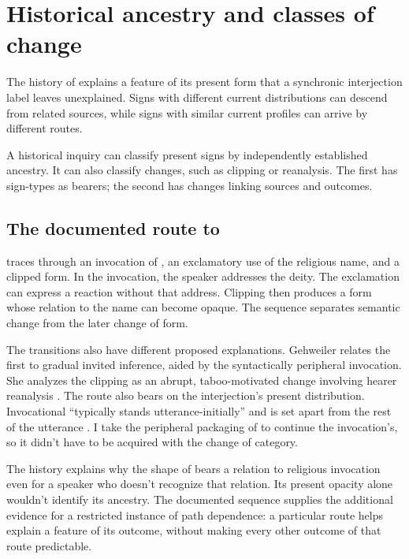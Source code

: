 \documentclass[12pt]{article}
\begin{document}
\section{Historical ancestry and classes of change}\label{sec:history}

The history of  explains a feature of its present form
that a synchronic interjection label leaves unexplained. Signs with
different current distributions can descend from related sources, while
signs with similar current profiles can arrive by different routes.

A historical inquiry can classify present signs by independently established
ancestry. It can also classify changes, such as clipping or reanalysis.
The first has sign-types as bearers; the second has changes linking
sources and outcomes.

\subsection{The documented route to }

\textcite{gehweiler2008} traces  through an invocation of ,
an exclamatory use of the religious name, and a clipped form. In the invocation, the speaker addresses the deity.
The exclamation can express a reaction without that address. Clipping
then produces a form whose relation to the name can become opaque.
The sequence separates semantic change from the later change of form.

The transitions also have different proposed explanations. Gehweiler
relates the first to gradual invited inference, aided by the syntactically
peripheral invocation. She analyzes the clipping as an abrupt, taboo-motivated
change involving hearer reanalysis \citep[84--88]{gehweiler2008}. The
route also bears on the interjection's present distribution. Invocational
 \enquote{typically stands utterance-initially} and is set
apart from the rest of the utterance \citep[85]{gehweiler2008}. I take the
peripheral packaging of  to continue the invocation's, so it
didn't have to be acquired with the change of category.

The history explains why the shape of  bears a relation
to religious invocation even for a speaker who doesn't recognize that
relation. Its present opacity alone wouldn't identify its ancestry.
The documented sequence supplies the additional evidence for a
restricted instance of path dependence: a particular route helps explain
a feature of its outcome, without making every other outcome of that
route predictable.
\end{document}
